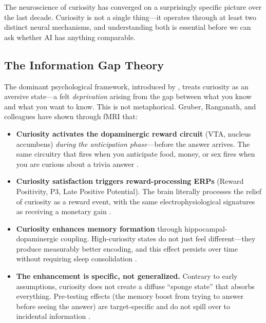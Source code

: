 The neuroscience of curiosity has converged on a surprisingly specific picture over the last decade. Curiosity is not a single thing---it operates through at least two distinct neural mechanisms, and understanding both is essential before we can ask whether AI has anything comparable.

\subsection{The Information Gap Theory}\label{subsec:info-gap}

The dominant psychological framework, introduced by \citet{loewenstein1994}, treats curiosity as an aversive state---a felt \emph{deprivation} arising from the gap between what you know and what you want to know. This is not metaphorical. Gruber, Ranganath, and colleagues have shown through fMRI that:

\begin{itemize}[leftmargin=*]
  \item \textbf{Curiosity activates the dopaminergic reward circuit} (VTA, nucleus accumbens) \emph{during the anticipation phase}---before the answer arrives. The same circuitry that fires when you anticipate food, money, or sex fires when you are curious about a trivia answer \citep{murphy2021,rueterbories2024}.

  \item \textbf{Curiosity satisfaction triggers reward-processing ERPs} (Reward Positivity, P3, Late Positive Potential). The brain literally processes the relief of curiosity as a reward event, with the same electrophysiological signatures as receiving a monetary gain \citep{rueterbories2024}.

  \item \textbf{Curiosity enhances memory formation} through hippocampal-dopaminergic coupling. High-curiosity states do not just feel different---they produce measurably better encoding, and this effect persists over time without requiring sleep consolidation \citep{stare2018}.

  \item \textbf{The enhancement is specific, not generalized.} Contrary to early assumptions, curiosity does not create a diffuse ``sponge state'' that absorbs everything. Pre-testing effects (the memory boost from trying to answer before seeing the answer) are target-specific and do not spill over to incidental information \citep{hollins2022}.
\end{itemize}

